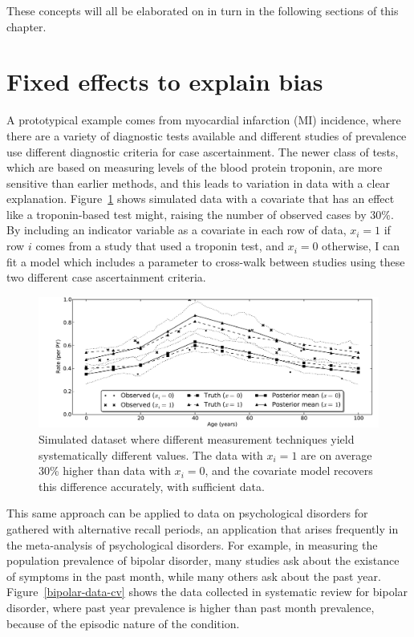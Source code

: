 These concepts will all be elaborated on in turn in the following
sections of this chapter.

\section{Fixed effects to explain bias}

A prototypical example comes from myocardial infarction (MI)
incidence, where there are a variety of diagnostic tests available and
different studies of prevalence use different diagnostic criteria
for case ascertainment.  The newer class of tests, which are based on
measuring levels of the blood protein troponin, are more sensitive
than earlier methods, and this leads to variation in data with a clear
explanation.  Figure~\ref{cov-sim} shows simulated data with a
covariate that has an effect like a troponin-based test might, raising
the number of observed cases by 30\%. By including an indicator
variable as a covariate in each row of data, $x_i = 1$ if row $i$
comes from a study that used a troponin test, and $x_i = 0$ otherwise,
I can fit a model which includes a parameter to cross-walk between
studies using these two different case ascertainment criteria.

\begin{figure}[h]
\begin{center}
\includegraphics[width=\textwidth]{cov_fe.pdf}
\caption{Simulated dataset where different measurement techniques
  yield systematically different values. The data with $x_i=1$ are on
  average 30\% higher than data with $x_i=0$, and the covariate model
  recovers this difference accurately, with sufficient data.}
\label{cov-sim}
\end{center}
\end{figure}

This same approach can be applied to data on psychological disorders for gathered with alternative
recall periods, an application that arises frequently in the
meta-analysis of psychological disorders.  For example, in measuring
the population prevalence of bipolar disorder, many studies ask about
the existance of symptoms in the past month, while many others ask
about the past year.  Figure~\ref{bipolar-data-cv} shows the data
collected in systematic review for bipolar disorder, where past year
prevalence is higher than past month prevalence, because of the
episodic nature of the condition.

